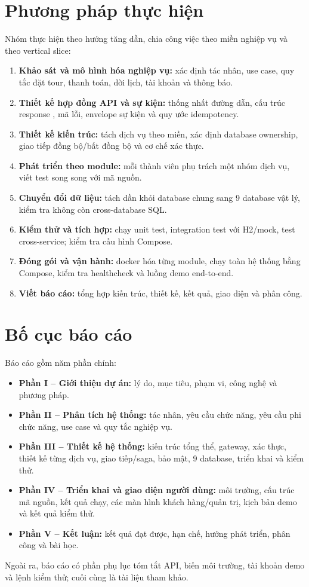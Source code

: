 \section{Phương pháp thực hiện}
\label{sec:phuong-phap}

Nhóm thực hiện theo hướng tăng dần, chia công việc theo miền nghiệp vụ và theo vertical slice:

\begin{enumerate}
  \item \textbf{Khảo sát và mô hình hóa nghiệp vụ:} xác định tác nhân, use case, quy tắc đặt tour, thanh toán, dời lịch, tài khoản và thông báo.
  \item \textbf{Thiết kế hợp đồng API và sự kiện:} thống nhất đường dẫn, cấu trúc response , mã lỗi, envelope sự kiện và quy ước idempotency.
  \item \textbf{Thiết kế kiến trúc:} tách dịch vụ theo miền, xác định database ownership, giao tiếp đồng bộ/bất đồng bộ và cơ chế xác thực.
  \item \textbf{Phát triển theo module:} mỗi thành viên phụ trách một nhóm dịch vụ, viết test song song với mã nguồn.
  \item \textbf{Chuyển đổi dữ liệu:} tách dần khỏi database chung sang 9 database vật lý, kiểm tra không còn cross-database SQL.
  \item \textbf{Kiểm thử và tích hợp:} chạy unit test, integration test với H2/mock, test cross-service; kiểm tra cấu hình Compose.
  \item \textbf{Đóng gói và vận hành:} docker hóa từng module, chạy toàn hệ thống bằng Compose, kiểm tra healthcheck và luồng demo end-to-end.
  \item \textbf{Viết báo cáo:} tổng hợp kiến trúc, thiết kế, kết quả, giao diện và phân công.
\end{enumerate}

\section{Bố cục báo cáo}
\label{sec:bo-cuc}

Báo cáo gồm năm phần chính:

\begin{itemize}
  \item \textbf{Phần I -- Giới thiệu dự án:} lý do, mục tiêu, phạm vi, công nghệ và phương pháp.
  \item \textbf{Phần II -- Phân tích hệ thống:} tác nhân, yêu cầu chức năng, yêu cầu phi chức năng, use case và quy tắc nghiệp vụ.
  \item \textbf{Phần III -- Thiết kế hệ thống:} kiến trúc tổng thể, gateway, xác thực, thiết kế từng dịch vụ, giao tiếp/saga, bảo mật, 9 database, triển khai và kiểm thử.
  \item \textbf{Phần IV -- Triển khai và giao diện người dùng:} môi trường, cấu trúc mã nguồn, kết quả chạy, các màn hình khách hàng/quản trị, kịch bản demo và kết quả kiểm thử.
  \item \textbf{Phần V -- Kết luận:} kết quả đạt được, hạn chế, hướng phát triển, phân công và bài học.
\end{itemize}

Ngoài ra, báo cáo có phần phụ lục tóm tắt API, biến môi trường, tài khoản demo và lệnh kiểm thử; cuối cùng là tài liệu tham khảo.